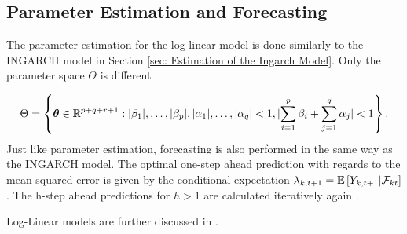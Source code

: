\subsection{Parameter Estimation and Forecasting}
\label{sec: Log-Linear Parameter Estimation and Forecasting}

The parameter estimation for the log-linear model is done similarly to the INGARCH model in Section \ref{sec: Estimation of the Ingarch Model}. Only the parameter space $\Theta$ is different

\begin{equation}
\Theta = \left\{ \bm{\theta} \in \mathbb{R}^{p+q+r+1}: \lvert\beta_1\rvert,\ldots,\lvert\beta_p\rvert,\lvert\alpha_1\rvert,\ldots,\lvert\alpha_q\rvert < 1, \lvert\sum_{i=1}^p\beta_i + \sum_{j=1}^q\alpha_j \rvert < 1 \right\}.
\label{eq:Parameter Space log-linear}
\end{equation}
%
Just like parameter estimation, forecasting is also performed in the same way as the INGARCH model. The optimal one-step ahead prediction with regards to the mean squared error is given by the conditional expectation $\lambda_{k,t+1}=\mathbb{E}\left[Y_{k,t+1} | \mathcal{F}_{kt} \right]$. The h-step ahead predictions for $h>1$ are calculated iteratively again \textcite{Liboschik:2016}. 

Log-Linear models are further discussed in \textcite{Fokianos:2011,Woodard:2011,Douc:2013}.


%
%
%
%
%

